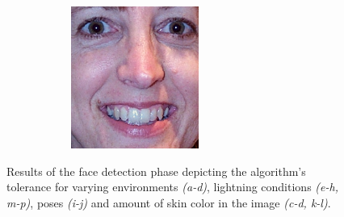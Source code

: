 \begin{figure}[H]
\begin{subfigure}{0.65\textwidth}
\begin{subfigure}{.33\textwidth}
  \caption{}
\end{subfigure}%
\begin{subfigure}{.33\textwidth}
  \centering
  \includegraphics[width=0.6\textwidth]{img/fdResult1/output76.png}
  \caption{}
\end{subfigure}%
\end{subfigure}%

\caption{Results of the face detection phase depicting the algorithm's tolerance for varying environments \textit{(a-d)}, lightning conditions \textit{(e-h, m-p)}, poses \textit{(i-j)} and amount of skin color in the image \textit{(c-d, k-l)}.}


\label{fig:someResults}
\end{figure}



